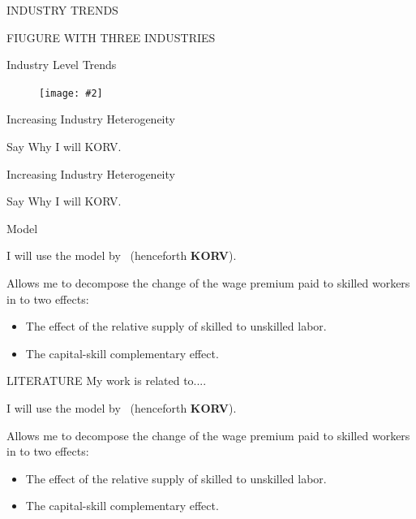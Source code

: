 \documentclass[notes,11pt, aspectratio=169]{beamer}
\makeatletter
\newcommand{\fitimage}[2][\@nil]{
  \begin{figure}
    \begin{adjustbox}{width=0.9\textwidth, totalheight=\textheight-2\baselineskip-2\baselineskip,keepaspectratio}
      \texttt{[image: \#2]}
    \end{adjustbox}
    \def\tmp{#1}%
   \ifx\tmp\@nnil
      \else
      \caption{#1}
    \fi
  \end{figure}
}
\newenvironment{wideitemize}{\itemize\addtolength{\itemsep}{10pt}}{\enditemize}
\makeatother
\begin{document}
\begin{frame}{INDUSTRY TRENDS}
\begin{center}
FIUGURE WITH THREE INDUSTRIES
    \center
\end{center}

\end{frame}\begin{frame}{Industry Level Trends \hyperlink{sp-model-decomposition}{}}\label{frame-industry-trends}
  \fitimage[]{../images/trend_correlation_slides.pdf}
\end{frame}
  
\begin{frame}{Increasing Industry Heterogeneity}
  \begin{center}
    Say Why I will KORV.
    \end{center}
\end{frame}

\begin{frame}{Increasing Industry Heterogeneity}
  \begin{center}
    Say Why I will KORV.
    \end{center}
\end{frame}

\begin{frame}{Model}
    \begin{wideitemize}
        \item I will use the model by~\cite{krusell2000capital} (henceforth \textbf{KORV}).
        \item Allows me to decompose the change of the wage premium paid to skilled workers in to two effects:
        \begin{itemize}
            \item The effect of the relative supply of skilled to unskilled labor.
            \item The capital-skill complementary effect.
        \end{itemize}
    \end{wideitemize}
\end{frame}

\begin{frame}{LITERATURE}
  My work is related to....
  \begin{wideitemize}
      \item I will use the model by~\cite{krusell2000capital} (henceforth \textbf{KORV}).
      \item Allows me to decompose the change of the wage premium paid to skilled workers in to two effects:
      \begin{itemize}
          \item The effect of the relative supply of skilled to unskilled labor.
          \item The capital-skill complementary effect.
      \end{itemize}
  \end{wideitemize}
\end{frame}
\end{document}
